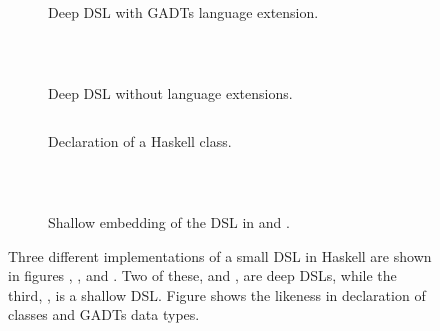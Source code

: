 \begin{figure}[ht]
\begin{subfigure}{.549\linewidth}
        \centering
        \inputminted[autogobble]{haskell}{code/data.hs}
        \caption{Deep \gls{DSL} with \gls{GADTs} language extension.\newline}
        \label{code:gadts_dsl}
\end{subfigure}
~
\begin{subfigure}{.449\linewidth}
        \centering
        \inputminted[autogobble]{haskell}{code/data_no_GATDs.hs}
        \caption{Deep \gls{DSL} without language extensions.} 
        \label{code:vanilla_dsl}                    
\end{subfigure}
\begin{subfigure}{.549\linewidth}
    \centering
    \inputminted{haskell}{code/class.hs}
    \caption{Declaration of a \gls{Haskell} class.\newline} 
    \label{code:class}
\end{subfigure}
~
\begin{subfigure}{.449\linewidth}
    \centering
    \inputminted[autogobble]{haskell}{code/shallow_dsl.hs}
    \caption{Shallow embedding of the \gls{DSL} in  and .} 
    \label{code:shallow}
\end{subfigure}
\caption{Three different implementations of a small \gls{DSL} in \gls{Haskell} are shown in figures , , and  . Two of these,  and , are deep \gls{DSL}s, while the third, , is a shallow \gls{DSL}. Figure  shows the likeness in declaration of classes and \gls{GADTs} data types.}
\label{fig:GADTs}
\end{figure}


